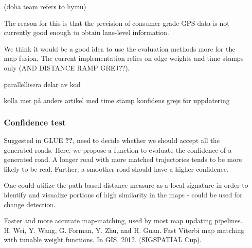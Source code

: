 (doha team refers to hymu)


The reason for this is that the precision of consumer-grade \ac{GPS}-data is not currently good enough to obtain lane-level information.


We think it would be a good idea to use the evaluation methods more for the map fusion. The current implementation relies on edge weights and time stamps only (AND DISTANCE RAMP GREJ??).



parallellisera delar av kod

kolla mer på anders artikel med time stamp konfidens grejs för uppdatering

\subsubsection{Confidence test}
Suggested in GLUE \textbf{??}, need to decide whether we should accept all the generated roads. Here, we propose a function to evaluate the confidence of a generated road. A longer road with more matched trajectories tends to be more likely to be real. Further, a smoother road should have a higher confidence.


One could utilize the path based distance measure as a local signature in order to identify and visualize portions of high similarity in the maps - could be used for change detection.

Faster and more accurate map-matching, used by most map updating pipelines.
H. Wei, Y. Wang, G. Forman, Y. Zhu, and H. Guan. Fast Viterbi map matching with tunable weight functions. In GIS, 2012. (SIGSPATIAL Cup).
